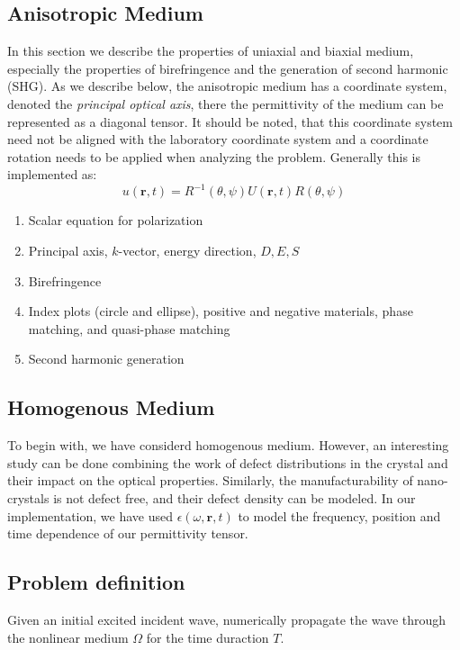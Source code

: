 \documentclass{article}[12pt]
\theoremstyle{plain}
\begin{document}
\subsection{Anisotropic Medium}
\label{subsec:anisotropic-medium}
In this section we describe the properties of uniaxial and biaxial medium, especially the
properties of birefringence and the generation of second harmonic (SHG). As we describe below,
the anisotropic medium has a coordinate system, denoted the \emph{principal optical axis}, there
the permittivity of the medium can be represented as a diagonal tensor. It should be noted, that this
coordinate system need not be aligned with the laboratory coordinate system and a coordinate rotation
needs to be applied when analyzing the problem. Generally this is implemented as:
\[
u(\mathbf{r},t) = R^{-1}(\theta,\psi) U(\mathbf{r},t) R(\theta,\psi)
\]

\begin{enumerate}
\item Scalar equation for polarization
\item Principal axis, $k$-vector, energy direction, $D,E,S$
\item Birefringence
\item Index plots (circle and ellipse), positive and negative materials, phase matching, and quasi-phase matching
\item Second harmonic generation
\end{enumerate}

\subsection{Homogenous Medium}
To begin with, we have considerd homogenous medium. However, an interesting study can be
done combining the work of defect distributions in the crystal and their impact on the optical
properties. Similarly, the manufacturability of nano-crystals is not defect free, and their
defect density can be modeled. In our implementation, we have used $\epsilon(\omega,\mathbf{r},t)$ to model
the frequency, position and time dependence of our permittivity tensor.

\subsection{Problem definition}
Given an initial excited incident wave, numerically propagate the wave through the nonlinear
medium $\Omega$ for the time duraction $T$.
\end{document}
